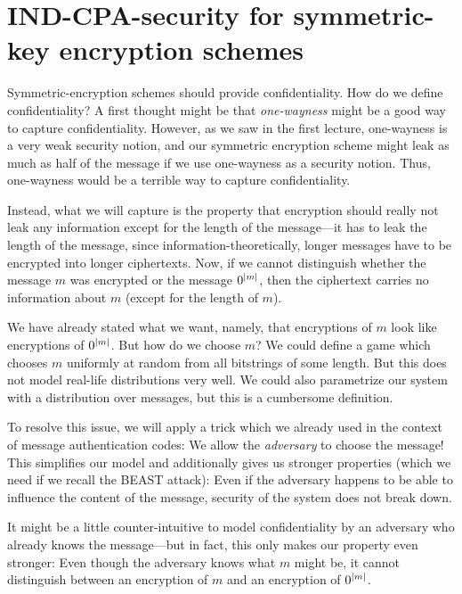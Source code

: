 \documentclass[a4paper,table,dvipsnames]{article}
\theoremstyle{definition}
\begin{document}
\section{IND-CPA-security for symmetric-key encryption schemes}
Symmetric-encryption schemes should provide confidentiality. How do we define confidentiality?
A first thought might be that \emph{one-wayness} might be a good way to capture confidentiality.
However, as we saw in the first lecture, one-wayness is a very weak security notion, and our
symmetric encryption scheme might leak as much as half of the message if we use one-wayness as
 a security notion. Thus, one-wayness would be a terrible way to capture confidentiality.

Instead, what we will capture is the property that encryption should really not leak any information
except for the length of the message---it has to leak the length of the message, since information-theoretically,
longer messages have to be encrypted into longer ciphertexts. Now, if we cannot distinguish whether
the message $m$ was encrypted or the message $0^{\left\lvert m\right\rvert}$, then the ciphertext carries no information
about $m$ (except for the length of $m$).

We have already stated what we want, namely, that encryptions of $m$ look like encryptions of $0^{\left\lvert m\right\rvert}$.
But how do we choose $m$? We could define a game which chooses $m$ uniformly at random from all bitstrings
of some length. But this does not model real-life distributions very well. We could also parametrize our
system with a distribution over messages, but this is a cumbersome definition.

To resolve this issue, we will apply a trick which we already used in the context of message authentication
codes: We allow the \emph{adversary} to choose the message! This simplifies our model and additionally gives
us stronger properties (which we need if we recall the BEAST attack): Even if the adversary happens to be
able to influence the content of the message, security of the system does not break down.

It might be a little counter-intuitive to model confidentiality by an adversary who already knows the
message---but in fact, this only makes our property even stronger: Even though the adversary knows what
$m$ might be, it cannot distinguish between an encryption of $m$ and an encryption of $0^{\left\lvert m\right\rvert}$.
\end{document}
